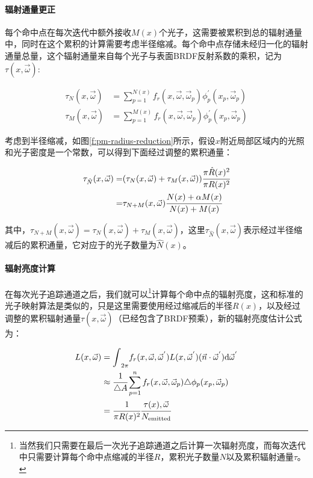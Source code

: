 \paragraph{辐射通量更正}
每个命中点在每次迭代中额外接收$M(x)$个光子，这需要被累积到总的辐射通量中，同时在这个累积的计算需要考虑半径缩减。每个命中点存储未经归一化的辐射通量总量，这个辐射通量来自每个光子与表面BRDF反射系数的乘积，记为$\tau(x,\vec{\omega})$:

\begin{equation}
\begin{aligned}
	\tau_N(x,\vec{\omega})&=\sum^{N(x)}_{p=1}f_r(x,\vec{\omega},\vec{\omega}_p)\phi^{'}_p(x_p,\vec{\omega}_p)\\
	\tau_M(x,\vec{\omega})&=\sum^{M(x)}_{p=1}f_r(x,\vec{\omega},\vec{\omega}_p)\phi^{'}_p(x_p,\vec{\omega}_p)
\end{aligned}
\end{equation}

\noindent 考虑到半径缩减，如图\ref{f:pm-radius-reduction}所示，假设$x$附近局部区域内的光照和光子密度是一个常数，可以得到下面经过调整的累积通量：

\begin{equation}
	\begin{aligned}
		\tau_{\hat{N}}(x,\vec{\omega})=&(\tau_N(x,\vec{\omega})+\tau_M(x,\vec{\omega})) \cfrac{\pi \hat{R}(x)^{2}}{\pi R(x)^{2}}\\
		=&\tau_{N+M}(x,\vec{\omega}) \cfrac{N(x)+\alpha M(x)}{N(x)+M(x)}
	\end{aligned}
\end{equation}

\noindent 其中，$\tau_{N+M}(x,\vec{\omega})=\tau_{N}(x,\vec{\omega})+\tau_{M}(x,\vec{\omega})$，这里$\tau_{\hat{N}}(x,\vec{\omega})$表示经过半径缩减后的累积通量，它对应于的光子数量为$\hat{N}(x)$。




\paragraph{辐射亮度计算}
在每次光子追踪通道之后，我们就可以\footnote{当然我们只需要在最后一次光子追踪通道之后计算一次辐射亮度，而每次迭代中只需要计算每个命中点缩减的半径$R$，累积光子数量$N$以及累积辐射通量$\tau$。}计算每个命中点的辐射亮度，这和标准的光子映射算法是类似的，只是这里需要使用经过缩减后的半径$R(x)$，以及经过调整的累积辐射通量$\tau (x,\vec{\omega})$（已经包含了BRDF预乘），新的辐射亮度估计公式为：

\begin{equation}
	\begin{aligned}
		L(x,\vec{\omega})&={\rm \int}_{2\pi}f_r(x,\vec{\omega},\vec{\omega}^{'})L(x,\vec{\omega}^{'})(\vec{n}\cdot\vec{\omega}^{'}){\rm d}\vec{\omega}^{'}\\
		&\approx  \cfrac{1}{\triangle A}\sum^{n}_{p=1}f_r(x,\vec{\omega},\vec{\omega}_p)\triangle\phi_p(x_p,\vec{\omega}_p)\\
		&= \cfrac{1}{\pi R(x)^{2}} \cfrac{\tau (x),\vec{\omega}}{N_{\rm emitted}}
	\end{aligned}
\end{equation}

